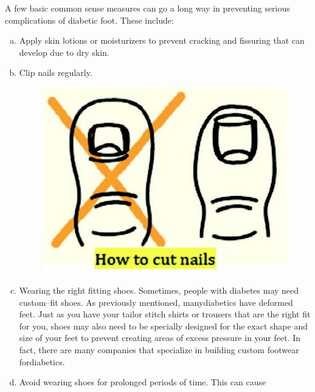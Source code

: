 A few basic common sense measures can go a long way in preve\-nting serious complications of diabetic foot. These include:
\vspace{-\topsep}
\begin{enumerate}[a.]
\itemsep=0pt
\item Apply skin lotions or moisturizers to prevent cracking and fissuring that can develop due to dry skin.
\item Clip nails regularly.
\vspace{-\topsep}
 \begin{figure}[h]
\centering
\includegraphics[scale=1]{images/065.jpg}
\end{figure}
\vspace{-\topsep}
\item Wearing the right fitting shoes. Sometimes, people with diabetes may need custom–fit shoes. As previously mentioned, many\break diabetics have deformed feet. Just as you have your tailor stitch shirts or trousers that are the right fit for you, shoes may also need to be specially designed for the exact shape and size of your feet to prevent creating areas of excess pressure in your feet. In fact, there are many companies that specialize in building custom footwear for\break diabetics.
\item Avoid wearing shoes for prolonged periods of time. This can cause


\end{enumerate}
